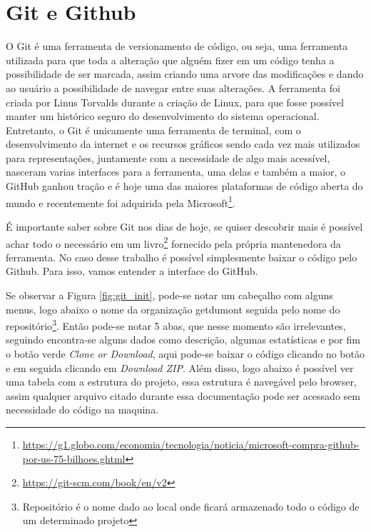 \chapter{Git e Github}
\label{app:git}
O Git é uma ferramenta de versionamento de código, ou seja, uma ferramenta utilizada para que toda a alteração que alguém fizer em um código tenha a possibilidade de ser marcada, assim criando uma arvore das modificações e dando ao usuário a possibilidade de navegar entre suas alterações. A ferramenta foi criada por Linus Torvalds durante a criação de Linux, para que fosse possível manter um histórico seguro do desenvolvimento do sistema operacional. Entretanto, o Git é unicamente uma ferramenta de terminal, com o desenvolvimento da internet e os recursos gráficos sendo cada vez mais utilizados para representações, juntamente com a necessidade de algo mais acessível, nasceram varias interfaces para a ferramenta, uma delas e também a maior, o GitHub ganhou tração e é hoje uma das maiores plataformas de código aberta do mundo e recentemente foi adquirida pela Microsoft\footnote{\url{https://g1.globo.com/economia/tecnologia/noticia/microsoft-compra-github-por-us-75-bilhoes.ghtml}}.

É importante saber sobre Git nos dias de hoje, se quiser descobrir mais é possível achar todo o necessário em um livro\footnote{\url{https://git-scm.com/book/en/v2}} fornecido pela própria mantenedora da ferramenta. No caso desse trabalho é possível simplesmente baixar o código pelo Github. Para isso, vamos entender a interface do GitHub.

Se observar a Figura \ref{fig:git_init}, pode-se notar um cabeçalho com alguns menus, logo abaixo o nome da organização getdumont seguida pelo nome do repositório\footnote{Repositório é o nome dado ao local onde ficará armazenado todo o código de um determinado projeto}. Então pode-se notar 5 abas, que nesse momento são irrelevantes, seguindo encontra-se alguns dados como descrição, algumas estatísticas e por fim o botão verde \textit{Clone or Download}, aqui pode-se baixar o código clicando no botão e em seguida clicando em \textit{Download ZIP}. Além disso, logo abaixo é possível ver uma tabela com a estrutura do projeto, essa estrutura é navegável pelo browser, assim qualquer arquivo citado durante essa documentação pode ser acessado sem necessidade do código na maquina.

